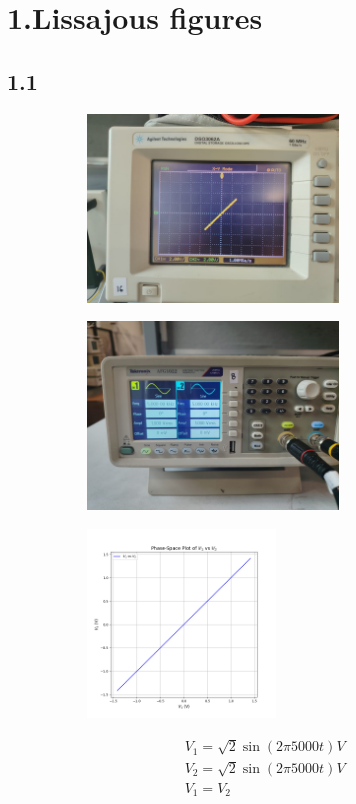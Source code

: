 \documentclass[a4paper,12pt]{article}
\begin{document}
\section*{1.Lissajous figures}
\subsection*{1.1}
\begin{figure}[H]
    \centering
    \begin{subfigure}{0.5\textwidth}
        \centering
        \includegraphics[height=5cm]{figs/1/plot.jpeg}
    \end{subfigure}%
    \begin{subfigure}{0.5\textwidth}
        \centering
        \includegraphics[height=5cm]{figs/1/para.jpeg}
    \end{subfigure}
    \begin{subfigure}{0.5\textwidth}
        \centering
        \includegraphics[height=5cm]{figs/1/pyplot.png}
    \end{subfigure}%
\end{figure}
\begin{align}
    &V_1=\sqrt{2}\sin(2\pi 5000t)V\\
    &V_2=\sqrt{2}\sin(2\pi 5000t)V\\
    &V_1=V_2
\end{align}
\end{document}
